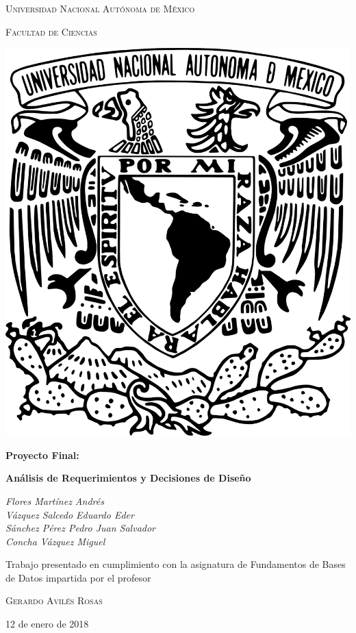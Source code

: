 \documentclass[11pt,letterpaper]{article}
\begin{document}
\begin{titlepage}
	\centering
	{\scshape\LARGE Universidad Nacional Autónoma de México \par}
	\vspace{1cm}
	{\scshape\Large Facultad de Ciencias\par}
	\vspace{1.5cm}
\begin{center}
		\includegraphics[scale=.5]{logo.png}
	\end{center}
		\vspace{.8 cm}

	{\Large \bfseries Proyecto Final: \par}
	{\Large\bfseries Análisis de Requerimientos y Decisiones de Diseño \par}
		\vspace{0.5cm}

	{\Large\itshape Flores Martínez Andrés\\
	Vázquez Salcedo Eduardo Eder\\
	Sánchez Pérez Pedro Juan Salvador\\
	Concha Vázquez Miguel\par}
	\vfill
			\vspace{0.5cm}

	Trabajo presentado en cumplimiento con la asignatura de Fundamentos de Bases de Datos impartida por el profesor	\par
	 \textsc{Gerardo Avilés Rosas}\\
	\vspace{0.1cm}
	{\large 12 de enero de 2018\par}
\end{titlepage}
\end{document}
